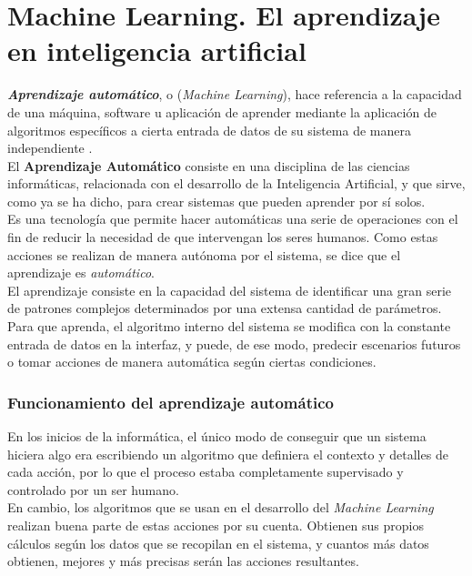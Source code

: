 \section{Machine Learning. El aprendizaje en inteligencia artificial}


\textbf{\textit{Aprendizaje automático}}, o (\textit{Machine Learning}), hace referencia a la capacidad de una máquina, software u aplicación de aprender mediante la aplicación de algoritmos específicos a cierta entrada de datos de su sistema de manera independiente \cite{apd2019ml}. \\

El \textbf{Aprendizaje Automático} consiste en una disciplina de las ciencias informáticas, relacionada con el desarrollo de la Inteligencia Artificial, y que sirve, como ya se ha dicho, para crear sistemas que pueden aprender por sí solos. \\

Es una tecnología que permite hacer automáticas una serie de operaciones con el fin de reducir la necesidad de que intervengan los seres humanos. Como estas acciones se realizan de manera autónoma por el sistema, se dice que el aprendizaje es \textit{automático}.\\

El aprendizaje consiste en la capacidad del sistema de identificar una gran serie de patrones complejos determinados por una extensa cantidad de parámetros. Para que aprenda, el algoritmo interno del sistema se modifica con la constante entrada de datos en la interfaz, y puede, de ese modo, predecir escenarios futuros o tomar acciones de manera automática según ciertas condiciones.

\subsubsection{Funcionamiento del aprendizaje automático}
En los inicios de la informática, el único modo de conseguir que un sistema hiciera algo era escribiendo un algoritmo que definiera el contexto y detalles de cada acción, por lo que el proceso estaba completamente supervisado y controlado por un ser humano. \\

En cambio, los algoritmos que se usan en el desarrollo del \textit{Machine Learning} realizan buena parte de estas acciones por su cuenta. Obtienen sus propios cálculos según los datos que se recopilan en el sistema, y cuantos más datos obtienen, mejores y más precisas serán las acciones resultantes. \\


